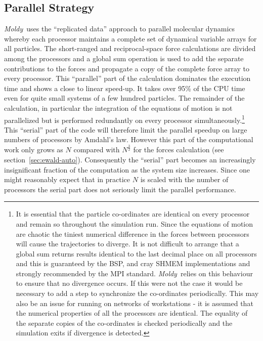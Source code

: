 \documentclass[a4paper,twoside]{report}
\newcommand{\moldy}{\emph{Moldy}}
\begin{document}
\subsection{Parallel Strategy}
\label{sec:parstrat}
\moldy\ uses the ``replicated data'' approach to parallel molecular
dynamics~\cite{clementi:85,smith:91} whereby each processor maintains
a complete set of dynamical variable arrays for all particles.  The
short-ranged and reciprocal-space force calculations are divided among
the processors and a global sum operation is used to add the separate
contributions to the forces and propagate a copy of the complete force
array to every processor.  This ``parallel'' part of the calculation
dominates the execution time and shows a close to linear speed-up. It
takes over 95\% of the CPU time even for quite small systems of a few
hundred particles.  The remainder of the calculation, in particular
the integration of the equations of motion is not parallelized but is
performed redundantly on every processor simultaneously.\footnote{It
  is essential that the particle co-ordinates are identical on every
  processor and remain so throughout the simulation run.  Since the
  equations of motion are chaotic the tiniest numerical difference in
  the forces between processors will cause the trajectories to
  diverge.  It is not difficult to arrange that a global sum returns
  results identical to the last decimal place on all processors and
  this is guaranteed by the BSP, and cray SHMEM implementations and
  strongly recommended by the MPI standard.  \moldy\ relies on this
  behaviour to ensure that no divergence occurs.  If this were not the
  case it would be necessary to add a step to synchronize the
  co-ordinates periodically.  This may also be an issue for running on
  networks of workstations - it is assumed that the numerical
  properties of all the processors are identical.  The equality of the
  separate copies of the co-ordinates is checked periodically and the
  simulation exits if divergence is detected.} This ``serial'' part of
the code will therefore limit the parallel speedup on large numbers of
processors by Amdahl's law. However this part of the computational
work only grows as $N$ compared with $N^\frac{3}{2}$ for the forces
calculation (see section~\ref{sec:ewald-auto}).  Consequently the
``serial'' part becomes an increasingly insignificant fraction of the
computation as the system size increases.  Since one might reasonably
expect that in practice $N$ is scaled with the number of processors
the serial part does not seriously limit the parallel performance.
\end{document}
